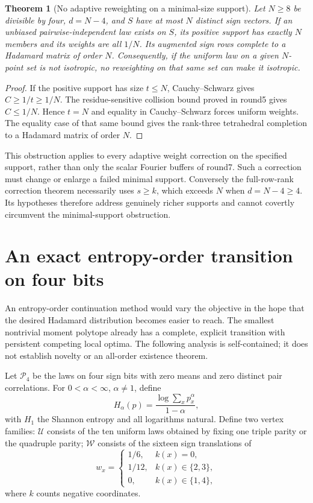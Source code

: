 \documentclass[11pt]{article}
\newtheorem{theorem}{Theorem}[section]
\begin{document}
\begin{theorem}[No adaptive reweighting on a minimal-size support]
Let $N\ge8$ be divisible by four, $d=N-4$, and $S$ have at most $N$
distinct sign vectors. If an unbiased pairwise-independent law exists
on $S$, its positive support has exactly $N$ members and its weights
are all $1/N$. Its augmented sign rows complete to a Hadamard matrix
of order $N$.
Consequently, if the uniform law on a given $N$-point set is not
isotropic, no reweighting on that same set can make it isotropic.
\end{theorem}
\begin{proof}
If the positive support has size $t\le N$, Cauchy--Schwarz gives
$C\ge1/t\ge1/N$. The residue-sensitive collision bound proved in
round5 gives $C\le1/N$. Hence $t=N$ and equality in Cauchy--Schwarz
forces uniform weights. The equality case of that same bound gives
the rank-three tetrahedral completion to a Hadamard matrix of order
$N$.
\end{proof}
This obstruction applies to every adaptive weight correction on the
specified support, rather than only the scalar Fourier buffers of
round7. Such a correction must change or enlarge a failed minimal
support. Conversely the full-row-rank correction theorem necessarily
uses $s\ge k$, which exceeds $N$ when $d=N-4\ge4$. Its hypotheses
therefore address genuinely richer supports and cannot covertly
circumvent the minimal-support obstruction.
\section{An exact entropy-order transition on four bits}
\label{sec:renyi-phase}
An entropy-order continuation method would vary the objective in the
hope that the desired Hadamard distribution becomes easier to reach.
The smallest nontrivial moment polytope already has a complete,
explicit transition with persistent competing local optima. The
following analysis is self-contained; it does not establish novelty
or an all-order existence theorem.

Let $\mathcal P_4$ be the laws on four sign bits with zero means and
zero distinct pair correlations. For $0<\alpha<\infty$, $\alpha\ne1$,
define
\[
 H_\alpha(p)=\frac{\log\sum_xp_x^\alpha}{1-\alpha},
\]
with $H_1$ the Shannon entropy and all logarithms natural.
Define two vertex families: $\mathcal U$ consists of the ten uniform
laws obtained by fixing one triple parity or the quadruple parity;
$\mathcal W$ consists of the sixteen sign translations of
\[
 w_x=\begin{cases}
 1/6,&k(x)=0,\\
 1/12,&k(x)\in\{2,3\},\\
 0,&k(x)\in\{1,4\},
 \end{cases}
\]
where $k$ counts negative coordinates.
\end{document}
